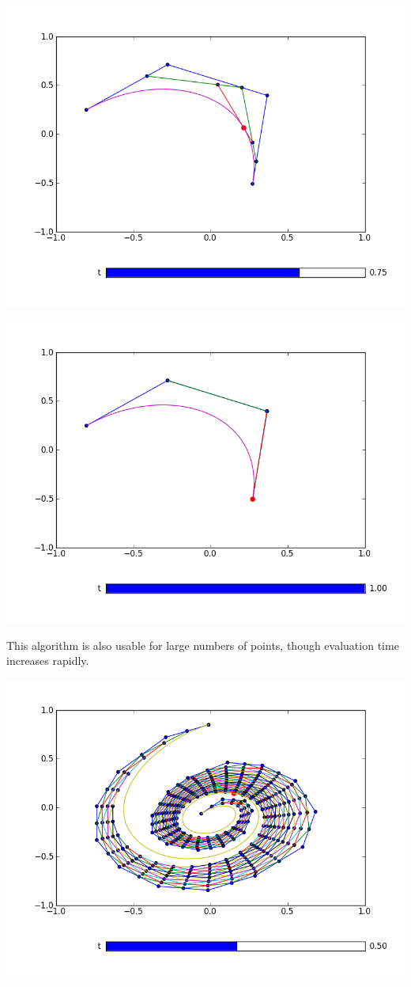 \includegraphics[width=\textwidth]{decasteljau_4}

\includegraphics[width=\textwidth]{decasteljau_5} 

This algorithm is also usable for large numbers of points, though evaluation time increases rapidly.

\includegraphics[width=\textwidth]{decasteljau_6}

